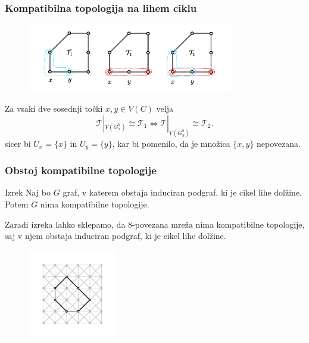 \documentclass{beamer}
\begin{document}
\begin{frame}[t]
    \frametitle{Kompatibilna topologija na lihem ciklu}
    \begin{figure}[h]
        \begin{center}
        \includegraphics[width=0.8\textwidth]{odd-circle-t1-t2-overlayed.pdf}
        \end{center}
    \end{figure}
    \pause
    Za vsaki dve sosednji točki $x,y \in V(C)$ velja
    \[
    \mathcal{T}|_{V(G_x^b)} \cong \mathcal{T}_1 \iff \mathcal{T}|_{V(G_y^b)} \cong \mathcal{T}_2.
    \]
    sicer bi $U_x = \{x\}$ in $U_y = \{y\}$, kar bi pomenilo, da je množica $\{x, y\}$ nepovezana.
\end{frame}
\begin{frame}[t]
    \frametitle{Obstoj kompatibilne topologije}
    \begin{block}{Izrek}
        Naj bo $G$ graf, v katerem obstaja induciran podgraf, ki je cikel lihe dolžine. Potem
        $G$ nima kompatibilne topologije.
    \end{block}
    \vspace{.5cm}
    \pause
    Zaradi izreka lahko sklepamo, da 8-povezana mreža nima kompatibilne topologije,
    saj v njem obstaja induciran podgraf, ki je cikel lihe dolžine.
    \begin{figure}
        \begin{center}
        \includegraphics[width=0.35\textwidth]{odd_circle.pdf}
        \end{center}
      \end{figure}
\end{frame}
\end{document}
